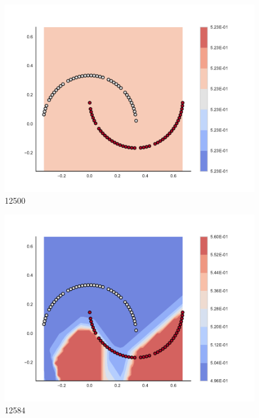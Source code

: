 \begin{subfigure}[b]{0.09\textwidth}
    \includegraphics[clip, trim=2.35cm 1.75cm 4.5cm 0cm,width=\textwidth]{img/convergence/12500.pdf}
    \caption{12500}
    \label{fig:convergence_12500}
\end{subfigure}
%
\begin{subfigure}[b]{0.09\textwidth}
    \includegraphics[clip, trim=2.35cm 1.75cm 4.5cm 0cm,width=\textwidth]{img/convergence/12584.pdf}
    \caption{12584}
    \label{fig:convergence_12584}
\end{subfigure}
%
